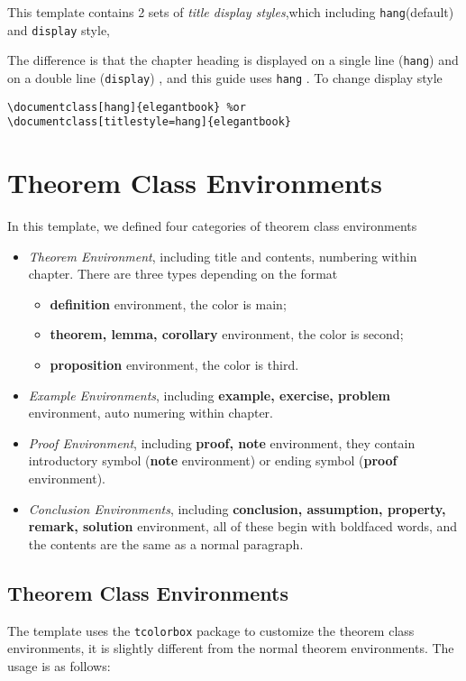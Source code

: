 \documentclass{elegantbook}
\begin{document}
This template contains 2 sets of \textit{title display styles},which including \lstinline{hang}(default) and \lstinline{display} style, 

The difference is that the chapter heading is displayed on a single line (\lstinline{hang}) and on a double line (\lstinline{display}) , and this guide uses \lstinline{hang} . To change display style

\begin{lstlisting}[frame=single]
\documentclass[hang]{elegantbook} %or
\documentclass[titlestyle=hang]{elegantbook}
\end{lstlisting}

\section{Theorem Class Environments}

In this template, we defined four categories of theorem class environments

\begin{itemize}
\item \textit{Theorem Environment}, including title and contents, numbering within chapter. There are three types depending on the format
   \begin{itemize}
      \item \textcolor{main}{\textbf{definition}} environment, the color is  \textcolor{main}{main};
      \item \textcolor{second}{\textbf{theorem, lemma, corollary}} environment, the color is \textcolor{second} {second};
      \item \textcolor{third}{\textbf{proposition}} environment, the color is \textcolor{third}{third}.
   \end{itemize}
\item \textit{Example Environments}, including \textbf{example, exercise, problem} environment, auto numering within chapter.
\item \textit{Proof Environment}, including \textbf{proof, note} environment, they contain introductory symbol (\textbf{note} environment) or ending symbol (\textbf{proof} environment).
\item \textit{Conclusion Environments}, including \textbf{conclusion, assumption, property, remark, solution} environment, all of these begin with boldfaced words, and the contents are the same as a normal paragraph.
\end{itemize}

\subsection{Theorem Class Environments}
The template uses the \lstinline{tcolorbox} package to customize the theorem class environments, it is slightly different from the normal theorem environments. The usage is as follows:
\end{document}
